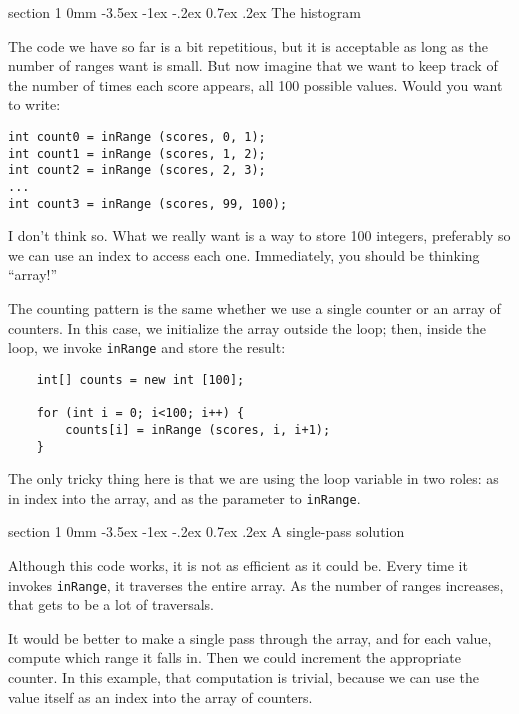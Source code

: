 \documentclass{book}
\makeatletter
\renewcommand{\section}{\@startsection 
    {section} {1} {0mm}%
    {-3.5ex \@plus -1ex \@minus -.2ex}%
    {0.7ex \@plus.2ex}%
    {\normalfont\Large\bfseries}}
\makeatother
\begin{document}
\section{The histogram}

The code we have so far is a bit repetitious, but it is acceptable as
long as the number of ranges want is small.  But now imagine that
we want to keep track of the number of times each score appears,
all 100 possible values.  Would you want to write:

\begin{verbatim}
int count0 = inRange (scores, 0, 1);
int count1 = inRange (scores, 1, 2);
int count2 = inRange (scores, 2, 3);
...
int count3 = inRange (scores, 99, 100);
\end{verbatim}

I don't think so.  What we really want is a
way to store 100 integers, preferably
so we can use an index to access each one.  Immediately,
you should be thinking ``array!''

The counting pattern is the same whether we use a single counter or an
array of counters.  In this case, we initialize the array outside the
loop; then, inside the loop, we invoke {\tt inRange} and store the
result:

\begin{verbatim}
    int[] counts = new int [100];

    for (int i = 0; i<100; i++) {
        counts[i] = inRange (scores, i, i+1);
    }
\end{verbatim}
%
The only tricky thing here is that we are using the loop variable
in two roles: as in index into the array, and as the parameter to
{\tt inRange}.


\section{A single-pass solution}

Although this code works, it is not as efficient as it could
be.  Every time it invokes {\tt inRange}, it traverses the
entire array.  As the number of ranges increases, that gets
to be a lot of traversals.

It would be better to make a single pass through the array,
and for each value, compute which range it falls in.  Then
we could increment the appropriate counter.
In this example, that computation is trivial, because we
can use the value itself as an index into the array of counters.
\end{document}
